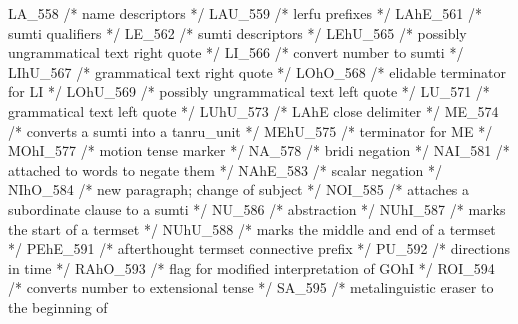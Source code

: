 LA_558           /*        name descriptors */
LAU_559          /*        lerfu prefixes */
LAhE_561         /*        sumti qualifiers */
LE_562           /*        sumti descriptors */
LEhU_565         /*        possibly ungrammatical text right quote */
LI_566           /*        convert number to sumti */
LIhU_567         /*        grammatical text right quote */
LOhO_568         /*        elidable terminator for LI */
LOhU_569         /*        possibly ungrammatical text left quote */
LU_571           /*        grammatical text left quote */
LUhU_573         /*        LAhE close delimiter */
ME_574           /*        converts a sumti into a tanru_unit */
MEhU_575         /*        terminator for ME */
MOhI_577         /*        motion tense marker */
NA_578           /*        bridi negation  */
NAI_581          /*        attached to words to negate them */
NAhE_583         /*        scalar negation  */
NIhO_584         /*        new paragraph; change of subject */
NOI_585          /*        attaches a subordinate clause to a sumti */
NU_586           /*        abstraction  */
NUhI_587         /*        marks the start of a termset */
NUhU_588         /*        marks the middle and end of a termset */
PEhE_591         /*        afterthought termset connective prefix */
PU_592           /*        directions in time */
RAhO_593         /*        flag for modified interpretation of GOhI */
ROI_594          /*        converts number to extensional tense */
SA_595           /*        metalinguistic eraser to the beginning of

